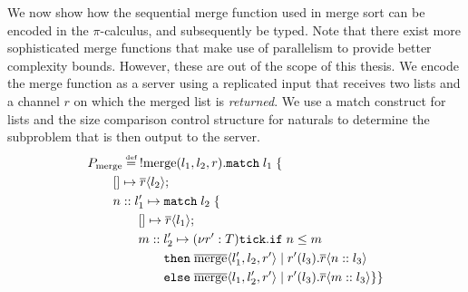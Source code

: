 


We now show how the sequential merge function used in merge sort can be encoded in the $\pi$-calculus, and subsequently be typed. Note that there exist more sophisticated merge functions that make use of parallelism to provide better complexity bounds. However, these are out of the scope of this thesis. We encode the merge function as a server using a replicated input that receives two lists and a channel $r$ on which the merged list is \textit{returned}. We use a match construct for lists and the size comparison control structure for naturals to determine the subproblem that is then output to the server.
\begin{align*}
    & P_{\text{merge}}\defeq\; !\text{merge}(l_1,l_2,r).\texttt{match}\; l_1\; \{\\ 
&\kern2em [] \mapsto \overline{r}\langle l_2 \rangle;\\
&\quad\quad n :: l_1' \mapsto \texttt{match}\; l_2\; \{\\ 
&\kern2em\quad\quad [] \mapsto \overline{r}\langle l_1 \rangle;\\
&\kern1em\quad\quad\quad m :: l_2' \mapsto
\newvar{r' : T}{\tick\texttt{if}\; n \leq m\\
&\kern6em\texttt{then}\; \overline{\text{merge}}\langle l_1', l_2, r' \rangle \mid r'(l_3).\overline{r}\langle n :: l_3 \rangle\\
&\kern6em\texttt{else}\; \overline{\text{merge}}\langle l_1, l_2', r' \rangle \mid r'(l_3).\overline{r}\langle m :: l_3 \rangle}
%
%
\}
\}
%
%
\end{align*}
